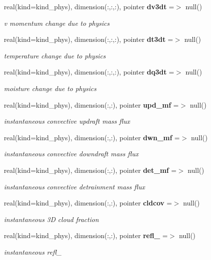 \begin{DoxyCompactItemize}
real(kind=kind\+\_\+phys), dimension(\+:,\+:,\+:), pointer \textbf{ dv3dt} =$>$ null()
\begin{DoxyCompactList}\small\item\em v momentum change due to physics \end{DoxyCompactList}\item 
real(kind=kind\+\_\+phys), dimension(\+:,\+:,\+:), pointer \textbf{ dt3dt} =$>$ null()
\begin{DoxyCompactList}\small\item\em temperature change due to physics \end{DoxyCompactList}\item 
real(kind=kind\+\_\+phys), dimension(\+:,\+:,\+:), pointer \textbf{ dq3dt} =$>$ null()
\begin{DoxyCompactList}\small\item\em moisture change due to physics \end{DoxyCompactList}\item 
real(kind=kind\+\_\+phys), dimension(\+:,\+:), pointer \textbf{ upd\+\_\+mf} =$>$ null()
\begin{DoxyCompactList}\small\item\em instantaneous convective updraft mass flux \end{DoxyCompactList}\item 
real(kind=kind\+\_\+phys), dimension(\+:,\+:), pointer \textbf{ dwn\+\_\+mf} =$>$ null()
\begin{DoxyCompactList}\small\item\em instantaneous convective downdraft mass flux \end{DoxyCompactList}\item 
real(kind=kind\+\_\+phys), dimension(\+:,\+:), pointer \textbf{ det\+\_\+mf} =$>$ null()
\begin{DoxyCompactList}\small\item\em instantaneous convective detrainment mass flux \end{DoxyCompactList}\item 
real(kind=kind\+\_\+phys), dimension(\+:,\+:), pointer \textbf{ cldcov} =$>$ null()
\begin{DoxyCompactList}\small\item\em instantaneous 3D cloud fraction \end{DoxyCompactList}\item 
real(kind=kind\+\_\+phys), dimension(\+:,\+:), pointer \textbf{ refl\+\_\+10cm} =$>$ null()
\begin{DoxyCompactList}\small\item\em instantaneous refl\+\_\+10cm \end{DoxyCompactList}\end{DoxyCompactItemize}


